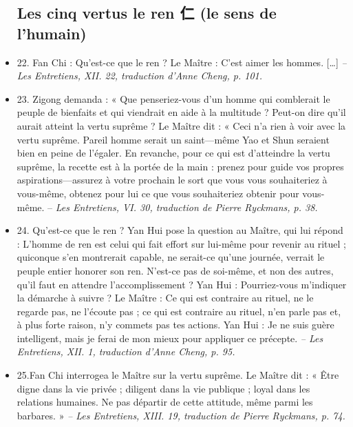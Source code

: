 \begin{itemize}
\subsection{Les cinq vertus   le ren 仁 (le sens de l’humain)  }
\item 22. \newline Fan Chi : Qu’est-ce que le ren ?  \newline Le Maître : C’est aimer les hommes.  […]  \textit{\small -- Les Entretiens, XII. 22, traduction d’Anne Cheng, p. 101.  }
\item 23. \newline Zigong demanda : « Que penseriez-vous d’un homme qui comblerait le peuple de bienfaits et qui viendrait en aide à la multitude ? Peut-on dire qu’il aurait atteint la vertu suprême ? \newline Le Maître dit : « Ceci n’a rien à voir avec la vertu suprême. Pareil homme serait un saint—même Yao et Shun seraient bien en peine de l’égaler. En revanche, pour ce qui est d’atteindre la vertu suprême, la recette est à la portée de la main : prenez pour guide vos propres aspirations—assurez à votre prochain le sort que vous vous souhaiteriez à vous-même, obtenez pour lui ce que vous souhaiteriez obtenir pour vous-même. -- \textit{\small Les Entretiens, VI. 30, traduction de Pierre Ryckmans, p. 38. } 

\item 24. \newline Qu’est-ce que le ren ? Yan Hui pose la question au Maître, qui lui répond : \newline L’homme de ren est celui qui fait effort sur lui-même pour revenir au rituel ; quiconque s’en montrerait capable, ne serait-ce qu’une journée, verrait le peuple entier honorer son ren. N’est-ce pas de soi-même, et non des autres, qu’il faut en attendre l’accomplissement ? \newline Yan Hui : Pourriez-vous m’indiquer la démarche à suivre ? \newline Le Maître : Ce qui est contraire au rituel, ne le regarde pas, ne l’écoute pas ; ce qui est contraire au rituel, n’en parle pas et, à plus forte raison, n’y commets pas tes actions. Yan Hui : Je ne suis guère intelligent, mais je ferai de mon mieux pour appliquer ce précepte. \textit{\small -- Les Entretiens, XII. 1, traduction d’Anne Cheng, p. 95.  }
\item 25.\newline Fan Chi interrogea le Maître sur la vertu suprême. \newline Le Maître dit : « Être digne dans la vie privée ; diligent dans la vie publique ; loyal dans les relations humaines. Ne pas départir de cette attitude, même parmi les barbares. » \textit{\small -- Les Entretiens, XIII. 19, traduction de Pierre Ryckmans, p. 74.  }

\end{itemize}
